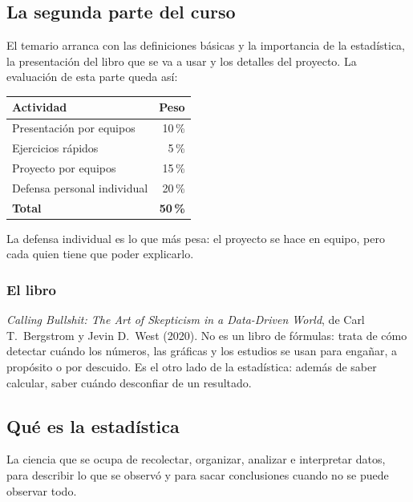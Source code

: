 \documentclass[11pt,letterpaper]{article}
\begin{document}
\subsection*{La segunda parte del curso}

El temario arranca con las definiciones básicas y la importancia de
la estadística, la presentación del libro que se va a usar y los
detalles del proyecto. La evaluación de esta parte queda así:

\begin{center}
\begin{tabular}{lr}
    \toprule
    \textbf{Actividad} & \textbf{Peso} \\
    \midrule
    Presentación por equipos       & 10\,\% \\
    Ejercicios rápidos             &  5\,\% \\
    Proyecto por equipos           & 15\,\% \\
    Defensa personal individual    & 20\,\% \\
    \midrule
    \textbf{Total}                 & \textbf{50\,\%} \\
    \bottomrule
\end{tabular}
\end{center}

La defensa individual es lo que más pesa: el proyecto se hace en
equipo, pero cada quien tiene que poder explicarlo.

\subsubsection*{El libro}

\textit{Calling Bullshit: The Art of Skepticism in a Data-Driven
World}, de Carl T.\ Bergstrom y Jevin D.\ West (2020). No es un libro
de fórmulas: trata de cómo detectar cuándo los números, las gráficas y
los estudios se usan para engañar, a propósito o por descuido. Es el
otro lado de la estadística: además de saber calcular, saber cuándo
desconfiar de un resultado.


\subsection*{Qué es la estadística}

\begin{definicion}[Estadística]
    La ciencia que se ocupa de recolectar, organizar, analizar e
    interpretar datos, para describir lo que se observó y para sacar
    conclusiones cuando no se puede observar todo.
\end{definicion}
\end{document}
